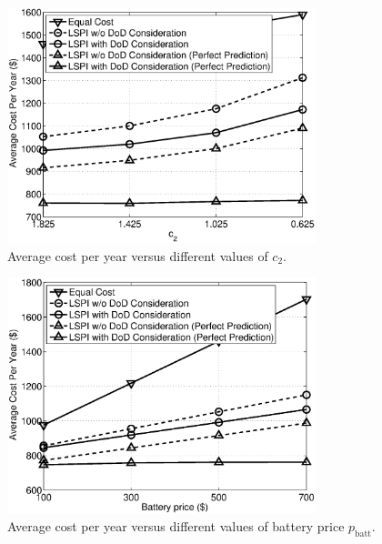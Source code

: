 \begin{figure}[t]
  \centering
  \includegraphics[width = 0.8\textwidth]{fig/av_cost_c2.eps}
  \caption{Average cost per year versus different values of $c_2$.}
  \label{fig:av_cost_c2}
\end{figure}

\begin{figure}[t]
  \centering
  \includegraphics[width = 0.8\textwidth]{fig/av_cost_p_batt.eps}
  \caption{Average cost per year versus different values of battery price $p_\text{batt}$.}
  \label{fig:av_cost_p_batt}
\end{figure}
